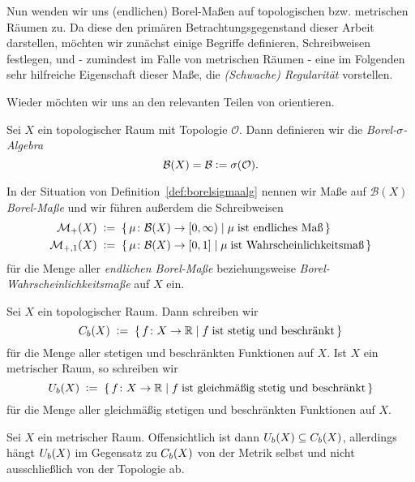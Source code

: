 \documentclass[../main/main.tex]{subfiles}
\begin{document}
	Nun wenden wir uns (endlichen) Borel-Maßen auf topologischen bzw. metrischen Räumen zu. Da diese den primären Betrachtungsgegenstand dieser
	Arbeit darstellen, möchten wir zunächst einige Begriffe definieren, Schreibweisen festlegen, und - zumindest im Falle von metrischen Räumen - eine im Folgenden sehr 
	hilfreiche Eigenschaft dieser Maße, die \emph{(Schwache) Regularität} vorstellen.
	
	Wieder möchten wir uns an den relevanten Teilen von \cite[Kapitel 4.14]{Simon.2015} orientieren.
	
	\begin{Definition}
		\label{def:borelsigmaalg}
		Sei $X$ ein topologischer Raum mit Topologie $\mathcal{O}$. Dann definieren wir die
		\emph{Borel-$\sigma$-Algebra} 
		$$\mathcal{B}(X) = \mathcal{B} \vcentcolon = \sigma(\mathcal{O}) \text{.}$$
	\end{Definition}

	\begin{Definition}
		In der Situation von Definition~\ref{def:borelsigmaalg} nennen wir Maße auf $\mathcal{B}(X)$ \emph{Borel-Maße} und wir führen außerdem die Schreibweisen
		\begin{align*}
			\mathcal{M}_{+}(X)  \; &\vcentcolon = \; \left\{\, \mu \colon \mathcal{B}(X) \to [0,\infty) \; \middle| \; \mu \; 
				\text{ist endliches Maß} \,\right\} \\
			\mathcal{M}_{+,1}(X) \; &\vcentcolon = \; \left\{\, \mu \colon \mathcal{B}(X) \to [0,1] \; \middle| \; \mu \; 
				\text{ist Wahrscheinlichkeitsmaß} \,\right\}
		\end{align*}
		für die Menge aller \emph{endlichen Borel-Maße} beziehungsweise \emph{Borel-Wahrscheinlichkeitsmaße} auf $X$ ein.
	\end{Definition}
	
	\begin{Definition}
		Sei $X$ ein topologischer Raum. Dann schreiben wir
		\[ C_b(X) \; \vcentcolon = \; \left\{\, f \colon X \to \mathbb{R} \; \middle| \; f \; \text{ist stetig und beschränkt} \,\right\} \]
		für die Menge aller stetigen und beschränkten Funktionen auf $X$. 
		Ist $X$ ein metrischer Raum, so schreiben wir
		\[ U_b(X) \; \vcentcolon = \; \left\{\, f \colon X \to \mathbb{R} \; \middle| \; f \; \text{ist gleichmäßig stetig und beschränkt} \,\right\} \]
		für die Menge aller gleichmäßig stetigen und beschränkten Funktionen auf $X$. 
	\end{Definition}
	
	\begin{Bemerkung}
		Sei $X$ ein metrischer Raum. Offensichtlich ist dann $U_b(X) \subseteq C_b(X)$, allerdings hängt $U_b(X)$ im Gegensatz 
		zu $C_b(X)$ von der Metrik selbst und nicht ausschließlich von der Topologie ab.
	\end{Bemerkung}
	
\end{document}
